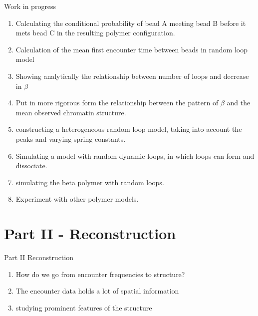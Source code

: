 \documentclass[8pt]{beamer}
\begin{document}
\begin{frame}{Work in progress}
\begin{enumerate}
\item Calculating the conditional probability of bead A meeting bead B before it mets bead C in the resulting polymer configuration. 
\item Calculation of the mean first encounter time between beads in random loop model 
\item Showing analytically the relationship between number of loops and decrease in $\beta$
\item Put in more rigorous form the relationship between the pattern of $\beta$ and the mean observed chromatin structure.
\item constructing a heterogeneous random loop model, taking into account the peaks and varying spring constants.
\item Simulating a model with random dynamic loops, in which loops can form and dissociate.
\item simulating the beta polymer with random loops. 
\item Experiment with other polymer models.
\end{enumerate}
\end{frame}

\section{Part II - Reconstruction}\label{section_partII} 
\begin{frame}{Part II Reconstruction}
\begin{enumerate}
\item How do we go from encounter frequencies to structure?
\item The encounter data holds a lot of spatial information 
\item studying prominent features of the structure 
\end{enumerate}
\end{frame}
\end{document}
